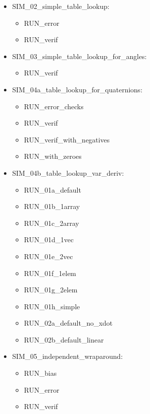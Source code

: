 \documentclass[11pt,fleqn]{report}
\begin{document}
\begin{itemize}
  \item SIM\_02\_simple\_table\_lookup:
  \begin{itemize}
    \item RUN\_error
    \item RUN\_verif
  \end{itemize}

  \item SIM\_03\_simple\_table\_lookup\_for\_angles:
  \begin{itemize}
    \item RUN\_verif
  \end{itemize}

  \item SIM\_04a\_table\_lookup\_for\_quaternions:
  \begin{itemize}
    \item RUN\_error\_checks
    \item RUN\_verif
    \item RUN\_verif\_with\_negatives
    \item RUN\_with\_zeroes
  \end{itemize}

  \item SIM\_04b\_table\_lookup\_var\_deriv:
  \begin{itemize}
    \item RUN\_01a\_default
    \item RUN\_01b\_1array
    \item RUN\_01c\_2array
    \item RUN\_01d\_1vec
    \item RUN\_01e\_2vec
    \item RUN\_01f\_1elem
    \item RUN\_01g\_2elem
    \item RUN\_01h\_simple
    \item RUN\_02a\_default\_no\_xdot
    \item RUN\_02b\_default\_linear
  \end{itemize}

  \item SIM\_05\_independent\_wraparound:
  \begin{itemize}
    \item RUN\_bias
    \item RUN\_error
    \item RUN\_verif
  \end{itemize}


\end{itemize}
\end{document}
